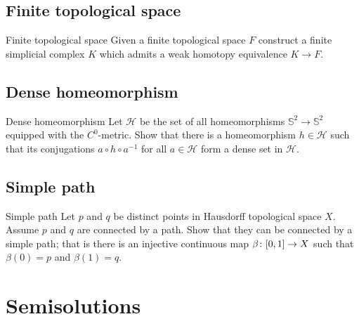 \subsection*{Finite topological space\easy}


\begin{pr}{\easy}{Finite topological space}\label{Finite topological space}
Given a finite topological space $F$ 
construct a finite simplicial complex $K$
which admits a weak homotopy equivalence  $K\to F$. 
\end{pr}

\subsection*{Dense homeomorphism\easy}

\begin{pr}{\easy}{Dense homeomorphism}\label{Dense homeomorphism}
Let $\mathcal{H}$ be the set of all homeomorphisms $\mathbb {S}^2\to\mathbb {S}^2$ 
equipped with the $C^0$-metric.
Show that there is a homeomorphism $h\in \mathcal{H}$ such that its conjugations $a\circ h\circ a^{-1}$ for all $a\in\mathcal{H}$ form a dense set in $\mathcal{H}$.
 
\end{pr}

\subsection*{Simple path\easy}


\begin{pr}{\easy}{Simple path}\label{Simple path}
Let $p$ and $q$ be distinct points in Hausdorff topological space $X$.
Assume $p$ and $q$ are connected by a path.
Show that they can be connected by a simple path;
that is there is an injective continuous map $\beta\:[0,1]\z\to X$
such that $\beta(0)=p$ and $\beta(1)=q$.
\end{pr}









\section*{Semisolutions}






